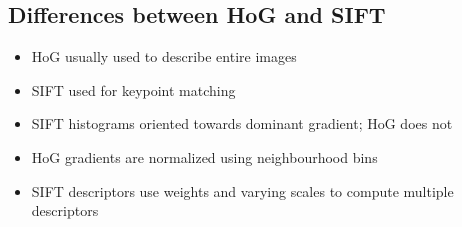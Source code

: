 \documentclass[letterpaper,12pt]{article}
\begin{document}
\subsection{Differences between HoG and SIFT}
\begin{itemize}
 \item HoG usually used to describe entire images
 \item SIFT used for keypoint matching
 \item SIFT histograms oriented towards dominant gradient; HoG does not
 \item HoG gradients are normalized using neighbourhood bins
 \item SIFT descriptors use weights and varying scales to compute multiple descriptors
\end{itemize}
\end{document}
